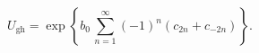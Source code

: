 \begin{equation}
U_{\text{gh}}=\exp\left\{
b_0\,\sum_{n=1}^{\infty}(-1)^n(c_{2n}+c_{-2n})
\right\}.
\label{Ugh2}
\end{equation}

